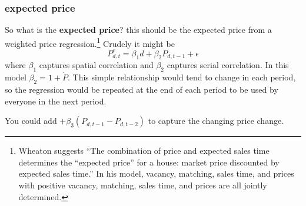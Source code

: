 \subsubsection{expected price}
So what is the \textbf{expected price}? this should be the expected price from a weighted price regression.\footnote{Wheaton \cite{wheatonVacancySearchPrices1990} suggests ``The combination of price and expected sales time determines the ``expected price'' for a house: market price discounted by expected sales time.'' In his model, vacancy, matching, sales time, and prices with positive vacancy, matching, sales time, and prices are all jointly determined.} Crudely it might be
\[P_{d,t}^e=\beta_1 d + \beta_2 P_{d,t-1} +\epsilon\]
where $\beta_1$ captures spatial correlation and $\beta_2$ captures serial correlation. In this model $\beta_2=1+\dot P$. This simple relationship would tend to change in each period, so the regression would be repeated  at the end of each period  to be used by everyone in the next period. 

You could add $+ \beta_3 (P_{d,t-1}-P_{d,t-2})$ to capture the changing  price change. 









